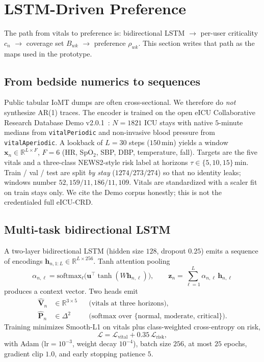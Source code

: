 \documentclass[journal,a4paper,10pt]{IEEEtran}
\newcommand{\R}{\mathbb{R}}
\begin{document}
\section{LSTM-Driven Preference}
\label{sec:lstm}

The path from vitals to preference is: bidirectional LSTM \(\to\) per-user criticality \(c_n\) \(\to\) coverage set \(B_{wk}\) \(\to\) preference \(\rho_{wk}\). This section writes that path as the maps used in the prototype.

\subsection{From bedside numerics to sequences}
Public tabular IoMT dumps are often cross-sectional. We therefore do \emph{not} synthesize AR(1) traces. The encoder is trained on the open eICU Collaborative Research Database Demo v2.0.1~\cite{pollard2018eicu,johnson2021eicudemo}: \(N=1821\) ICU stays with native \(5\)-minute medians from \texttt{vitalPeriodic} and non-invasive blood pressure from \texttt{vitalAperiodic}. A lookback of \(L=30\) steps (\(150\)\,min) yields a window \(\mathbf{x}_n\in\R^{L\times F}\), \(F=6\) (HR, SpO\(_2\), SBP, DBP, temperature, fall). Targets are the five vitals and a three-class NEWS2-style risk label at horizons \(\tau\in\{5,10,15\}\)\,min. Train / val / test are split \emph{by stay} (\(1274/273/274\)) so that no identity leaks; windows number \(52{,}159/11{,}186/11{,}109\). Vitals are standardized with a scaler fit on train stays only. We cite the Demo corpus honestly; this is not the credentialed full eICU-CRD.

\subsection{Multi-task bidirectional LSTM}
A two-layer bidirectional LSTM (hidden size \(128\), dropout \(0.25\)) emits a sequence of encodings \(\mathbf{h}_{n,1:L}\in\R^{L\times 256}\). Tanh attention pooling
\begin{equation}
  \alpha_{n,\ell}
  =\mathrm{softmax}_\ell\bigl(\mathbf{u}^\top\tanh(W\mathbf{h}_{n,\ell})\bigr),\qquad
  \mathbf{z}_n
  =\sum_{\ell=1}^{L}\alpha_{n,\ell}\,\mathbf{h}_{n,\ell}
  \label{eq:attn}
\end{equation}
produces a context vector. Two heads emit
\begin{align}
  \hat{\mathbf{V}}_n &\in\R^{3\times 5}
  &&\text{(vitals at three horizons),}\\
  \hat{\mathbf{P}}_n &\in\Delta^2
  &&\text{(softmax over }\{\text{normal, moderate, critical}\}\text{).}
\end{align}
Training minimizes Smooth-L1 on vitals plus class-weighted cross-entropy on risk,
\begin{equation}
  \mathcal{L}
  =\mathcal{L}_{\mathrm{vital}}
  +0.35\,\mathcal{L}_{\mathrm{risk}},
  \label{eq:lstm-loss}
\end{equation}
with Adam (\(\mathrm{lr}=10^{-3}\), weight decay \(10^{-4}\)), batch size \(256\), at most \(25\) epochs, gradient clip \(1.0\), and early stopping patience \(5\).
\end{document}
